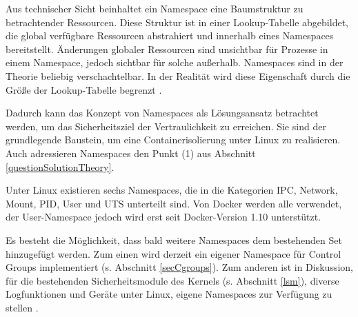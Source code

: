 \documentclass[../main.tex]{subfiles}
\begin{document}




		Aus technischer Sicht beinhaltet ein Namespace eine Baumstruktur zu betrachtender Ressourcen. Diese Struktur ist in einer Lookup-Tabelle abgebildet, die global verfügbare Ressourcen abstrahiert und innerhalb eines Namespaces bereitstellt. Änderungen globaler Ressourcen sind unsichtbar für Prozesse in einem Namespace, jedoch sichtbar für solche außerhalb. Namespaces sind in der Theorie beliebig verschachtelbar. In der Realität wird diese Eigenschaft durch die Größe der Lookup-Tabelle begrenzt \cite[S.1f.]{IBMcheckpointRestart}\cite{namespaces}.

		Dadurch kann das Konzept von Namespaces als Lösungsansatz betrachtet werden, um das Sicherheitsziel der Vertraulichkeit zu erreichen. Sie sind der grundlegende Baustein, um eine Containerisolierung unter Linux zu realisieren. Auch adressieren Namespaces den Punkt (1) aus Abschnitt \ref{questionSolutionTheory}.

		Unter Linux existieren sechs Namespaces, die in die Kategorien \acrshort{IPC}, Network, Mount, \acrshort{PID}, User und \acrshort{UTS} unterteilt sind. Von Docker werden alle verwendet, der User-Namespace jedoch wird erst seit Docker-Version 1.10 unterstützt.

		Es besteht die Möglichkeit, dass bald weitere Namespaces dem bestehenden Set hinzugefügt werden. Zum einen wird derzeit ein eigener Namespace für Control Groups implementiert (s. Abschnitt \ref{secCgroups}). Zum anderen ist in Diskussion, für die bestehenden Sicherheitsmodule des Kernels (s. Abschnitt \ref{lsm}), diverse Logfunktionen und Geräte unter Linux, eigene Namespaces zur Verfügung zu stellen \cite[S.19]{presContainerSec}.

\end{document}
